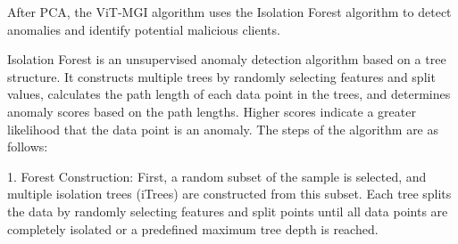 \documentclass[conference]{IEEEtran}
\begin{document}




After PCA, the ViT-MGI algorithm uses the Isolation Forest algorithm to detect anomalies and identify potential malicious clients. 


Isolation Forest is an unsupervised anomaly detection algorithm based on a tree structure. It constructs multiple trees by randomly selecting features and split values, calculates the path length of each data point in the trees, and determines anomaly scores based on the path lengths. Higher scores indicate a greater likelihood that the data point is an anomaly. The steps of the algorithm are as follows:


1. Forest Construction: First, a random subset of the sample is selected, and multiple isolation trees (iTrees) are constructed from this subset. Each tree splits the data by randomly selecting features and split points until all data points are completely isolated or a predefined maximum tree depth is reached.
\end{document}
